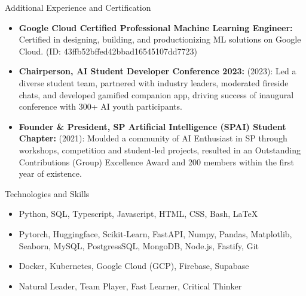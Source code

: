 \documentclass[]{mcdowellcv}
\begin{document}
	\begin{cvsection}{Additional Experience and Certification}
		\begin{cvsubsection}{}{}{}	
			\begin{itemize}
				\item \textbf{Google Cloud Certified Professional Machine Learning Engineer:} Certified in designing, building, and productionizing ML solutions on Google Cloud. (ID: 43ffb52bffed42bbad16545107dd7723)
				
				
				\item \textbf{Chairperson, AI Student Developer Conference 2023:} (2023): Led a diverse student team, partnered with industry leaders, moderated fireside chats, and developed gamified companion app, driving success of inaugural conference with 300+ AI youth participants.
				
				
				
				
				
				
				
				\item \textbf{Founder \& President, SP Artificial Intelligence (SPAI) Student Chapter:} (2021): Moulded a community of AI Enthusiast in SP through workshops, competition and student-led projects, resulted in an Outstanding Contributions (Group) Excellence Award and 200 members within the first year of existence.
				
				
			\end{itemize}
		\end{cvsubsection}
	\end{cvsection}
	
	\begin{cvsection}{Technologies and Skills}
		\begin{cvsubsection}{}{}{}	
			\begin{itemize}
				\item Python, SQL, Typescript, Javascript, HTML, CSS, Bash, \LaTeX
				\item Pytorch, Huggingface, Scikit-Learn, FastAPI, Numpy, Pandas, Matplotlib, Seaborn, MySQL, PostgressSQL, MongoDB, Node.js, Fastify, Git
				\item Docker, Kubernetes, Google Cloud (GCP), Firebase, Supabase
				\item Natural Leader, Team Player, Fast Learner, Critical Thinker
			\end{itemize}
		\end{cvsubsection}
	\end{cvsection}
	
\end{document}
